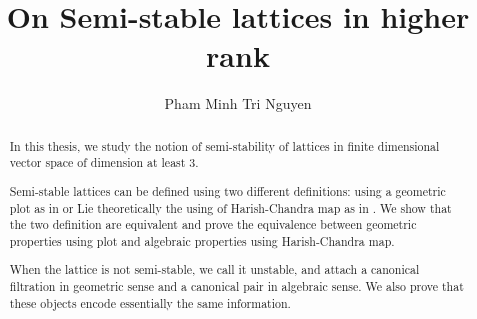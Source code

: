 \documentclass[12pt,twoside]{report}
\begin{document}

\flushbottom
\thispagestyle{empty}
\def\ThesisTitle{On Semi-stable lattices in higher rank}
\def\ThesisAuthor{Pham Minh Tri Nguyen}




\hypersetup{
  pdftitle=\ThesisTitle,
  pdfauthor=\ThesisAuthor,
  pdfpagemode=UseOutlines,
  citebordercolor=0 0 1,
  colorlinks=true,
  allcolors=heavyblue,
  breaklinks=true,
  pdfpagetransition=Dissolve,
  bookmarks=true
}
\title{\ThesisTitle}
\author{\ThesisAuthor}
\beforebodyoftex
\titlepage
\setcounter{page}{0}\thispagestyle{empty}$\text{ }$

\newpage\setcounter{page}{2}

\begin{abstract} \doublespacing
 In this thesis, we study the notion of semi-stability of lattices in finite dimensional vector space of dimension at least 3.

 Semi-stable lattices can be defined using two different definitions: using a geometric plot as in \cite{MR780079} or Lie theoretically the using of Harish-Chandra map as in \cite{MR3969872}. We show that 
 the two definition are equivalent and prove the equivalence between geometric properties using plot and algebraic properties using Harish-Chandra map. 
 
  
 When the lattice is not semi-stable, we call it unstable, and attach 
 a canonical filtration in geometric sense and a  canonical pair in algebraic sense. We also prove that these objects encode essentially the same information. 

 
\end{abstract}%
\end{document}
